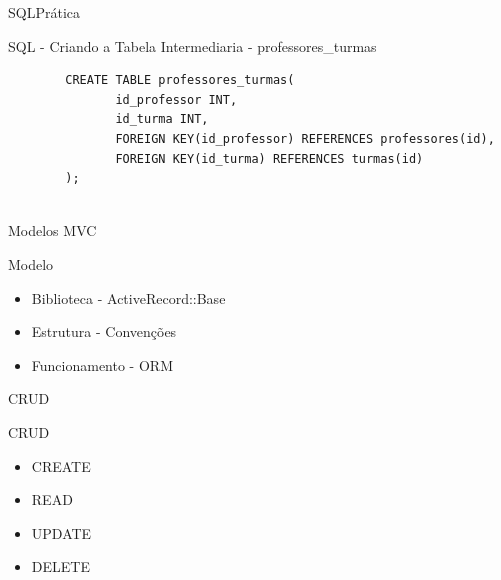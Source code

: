 \documentclass{beamer}
\begin{document}
\begin{frame}[fragile]{SQL}{Prática}
	\begin{block} {SQL - Criando a Tabela Intermediaria - professores\_turmas}
		\begin{verbatim}
		CREATE TABLE professores_turmas(
		       id_professor INT, 
		       id_turma INT, 
		       FOREIGN KEY(id_professor) REFERENCES professores(id), 
		       FOREIGN KEY(id_turma) REFERENCES turmas(id)
		);
		
		\end{verbatim}
	\end{block}
\end{frame}

\begin{frame}{Modelos MVC}
	\begin{block} {\LARGE Modelo}
		\begin{itemize} \itemsep 2em
			\item{\LARGE Biblioteca - ActiveRecord::Base}
			\item{\LARGE Estrutura - Convenções}
			\item{\LARGE Funcionamento - ORM}
		\end{itemize}
	\end{block}
\end{frame}


\begin{frame}{CRUD}
	\begin{block} {\LARGE CRUD}
		\begin{itemize} \itemsep 2em
			\item{\LARGE CREATE}
			\item{\LARGE READ}
			\item{\LARGE UPDATE}
			\item{\LARGE DELETE}				
		\end{itemize}
	\end{block}
\end{frame}
\end{document}
